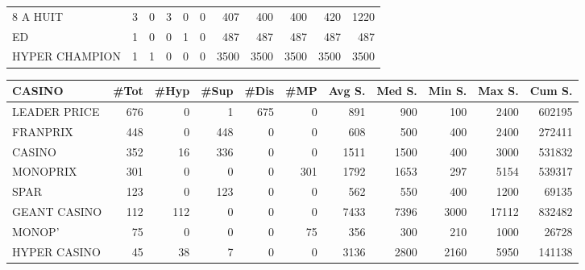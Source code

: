 \documentclass[11pt]{article}
\begin{document}
\begin{table}[H]
\begin{tabular}{lrrrrrrrrrr}
8 A HUIT           &          3 &          0 &          3 &          0 &          0 &        407 &        400 &        400 &        420 &       1220 \\
ED                 &          1 &          0 &          0 &          1 &          0 &        487 &        487 &        487 &        487 &        487 \\
HYPER CHAMPION     &          1 &          1 &          0 &          0 &          0 &       3500 &       3500 &       3500 &       3500 &       3500 \\
\bottomrule
\end{tabular}
\end{table}

\begin{table}[H]
\footnotesize
\setlength{\tabcolsep}{2pt}
\begin{tabular}{lrrrrrrrrrr}
\toprule
CASINO &       \#Tot &       \#Hyp &       \#Sup &       \#Dis &        \#MP &     Avg S. &     Med S. &     Min S. &     Max S. &     Cum S. \\
\midrule
LEADER PRICE     &        676 &          0 &          1 &        675 &          0 &        891 &        900 &        100 &       2400 &     602195 \\
FRANPRIX         &        448 &          0 &        448 &          0 &          0 &        608 &        500 &        400 &       2400 &     272411 \\
CASINO           &        352 &         16 &        336 &          0 &          0 &       1511 &       1500 &        400 &       3000 &     531832 \\
MONOPRIX         &        301 &          0 &          0 &          0 &        301 &       1792 &       1653 &        297 &       5154 &     539317 \\
SPAR             &        123 &          0 &        123 &          0 &          0 &        562 &        550 &        400 &       1200 &      69135 \\
GEANT CASINO     &        112 &        112 &          0 &          0 &          0 &       7433 &       7396 &       3000 &      17112 &     832482 \\
MONOP'           &         75 &          0 &          0 &          0 &         75 &        356 &        300 &        210 &       1000 &      26728 \\
HYPER CASINO     &         45 &         38 &          7 &          0 &          0 &       3136 &       2800 &       2160 &       5950 &     141138 \\

\end{tabular}
\end{table}
\end{document}

